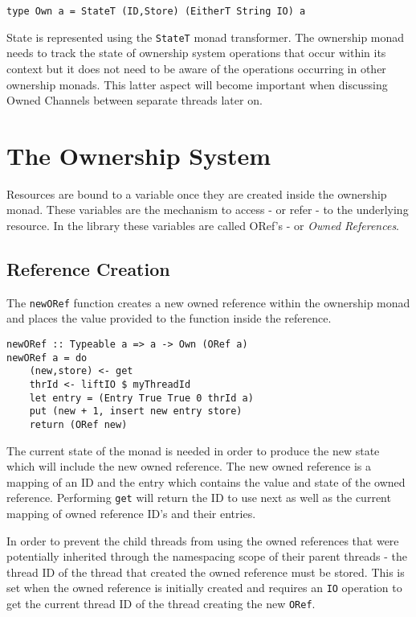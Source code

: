 \documentclass[onehalf,11pt]{beavtex}
\begin{document}
\begin{verbatim}
type Own a = StateT (ID,Store) (EitherT String IO) a
\end{verbatim}

State is represented using the \texttt{StateT} monad transformer.
The ownership monad needs to track the state of ownership system operations
that occur within its context but it does not need to be aware of the
operations occurring in other ownership monads. This latter aspect will become
important when discussing Owned Channels between separate threads later on.


\section{The Ownership System}

Resources are bound to a variable once they are created inside the ownership
monad.  These variables are the mechanism to access - or refer - to the
underlying resource.  In the library these variables are called ORef's -
or \textit{Owned References}.

\subsection{Reference Creation}

The \texttt{newORef} function creates a new owned reference
within the ownership monad and places the value provided to the function
inside the reference. 

\begin{verbatim}
newORef :: Typeable a => a -> Own (ORef a)
newORef a = do
    (new,store) <- get
    thrId <- liftIO $ myThreadId
    let entry = (Entry True True 0 thrId a)
    put (new + 1, insert new entry store)
    return (ORef new)
\end{verbatim}

The current state of the monad is needed in order
to produce the new state which will include the new owned reference.
The new owned reference is a mapping of an ID and the entry which contains
the value and state of the owned reference.
Performing \texttt{get} will return the ID to use next as well as the current
mapping of owned reference ID's and their entries.

In order to prevent the child threads from using the owned references that
were potentially inherited through the namespacing scope of their parent
threads - the thread ID of the thread that created the owned reference must
be stored.
This is set when the owned reference is initially created and requires
an \texttt{IO} operation to get the current thread ID of the thread
creating the new \texttt{ORef}.
\end{document}
